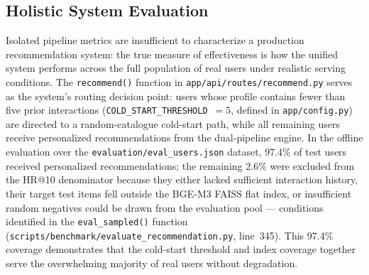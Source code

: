 
\subsection{Holistic System Evaluation}
\label{subsec:holistic-eval}

Isolated pipeline metrics are insufficient to characterize a production recommendation
system: the true measure of effectiveness is how the unified system performs across the
full population of real users under realistic serving conditions.
The \texttt{recommend()} function in \texttt{app/api/routes/recommend.py} serves as the
system's routing decision point: users whose profile contains fewer than five prior
interactions (\texttt{COLD\_START\_THRESHOLD}~$=5$, defined in \texttt{app/config.py}) are
directed to a random-catalogue cold-start path, while all remaining users receive
personalized recommendations from the dual-pipeline engine.
In the offline evaluation over the \texttt{evaluation/eval\_users.json} dataset, 97.4\% of
test users received personalized recommendations; the remaining 2.6\% were excluded from
the HR@10 denominator because they either lacked sufficient interaction history, their target
test items fell outside the BGE-M3 FAISS flat index, or insufficient random negatives could
be drawn from the evaluation pool --- conditions identified in the \texttt{eval\_sampled()}
function (\texttt{scripts/benchmark/evaluate\_recommendation.py}, line~345).
This 97.4\% coverage demonstrates that the cold-start threshold and index coverage together
serve the overwhelming majority of real users without degradation.


